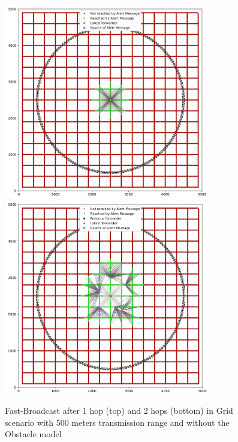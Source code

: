 		\begin{figure}[H]
			\centering
			\includegraphics[width=0.8\textwidth]{immagini/grid-300/b0/fb-1hop}
			\includegraphics[width=0.8\textwidth]{immagini/grid-300/b0/fb-2hop}
			\caption{Fast-Broadcast after 1 hop (top) and 2 hops (bottom) in Grid scenario with 500 meters transmission range and without the Obstacle model}
			\label{fig:fb-b0-grid-transmission} 
		\end{figure}
		
